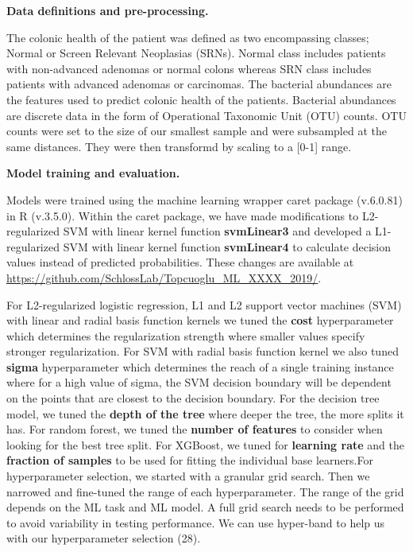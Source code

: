 \documentclass[11pt,]{article}
\begin{document}
\textbf{Data definitions and pre-processing.}

The colonic health of the patient was defined as two encompassing
classes; Normal or Screen Relevant Neoplasias (SRNs). Normal class
includes patients with non-advanced adenomas or normal colons whereas
SRN class includes patients with advanced adenomas or carcinomas. The
bacterial abundances are the features used to predict colonic health of
the patients. Bacterial abundances are discrete data in the form of
Operational Taxonomic Unit (OTU) counts. OTU counts were set to the size
of our smallest sample and were subsampled at the same distances. They
were then transformd by scaling to a {[}0-1{]} range.

\textbf{Model training and evaluation.}

Models were trained using the machine learning wrapper caret package
(v.6.0.81) in R (v.3.5.0). Within the caret package, we have made
modifications to L2-regularized SVM with linear kernel function
\textbf{svmLinear3} and developed a L1-regularized SVM with linear
kernel function \textbf{svmLinear4} to calculate decision values instead
of predicted probabilities. These changes are available at
\url{https://github.com/SchlossLab/Topcuoglu_ML_XXXX_2019/}.

For L2-regularized logistic regression, L1 and L2 support vector
machines (SVM) with linear and radial basis function kernels we tuned
the \textbf{cost} hyperparameter which determines the regularization
strength where smaller values specify stronger regularization. For SVM
with radial basis function kernel we also tuned \textbf{sigma}
hyperparameter which determines the reach of a single training instance
where for a high value of sigma, the SVM decision boundary will be
dependent on the points that are closest to the decision boundary. For
the decision tree model, we tuned the \textbf{depth of the tree} where
deeper the tree, the more splits it has. For random forest, we tuned the
\textbf{number of features} to consider when looking for the best tree
split. For XGBoost, we tuned for \textbf{learning rate} and the
\textbf{fraction of samples} to be used for fitting the individual base
learners.For hyperparameter selection, we started with a granular grid
search. Then we narrowed and fine-tuned the range of each
hyperparameter. The range of the grid depends on the ML task and ML
model. A full grid search needs to be performed to avoid variability in
testing performance. We can use hyper-band to help us with our
hyperparameter selection (28).
\end{document}
